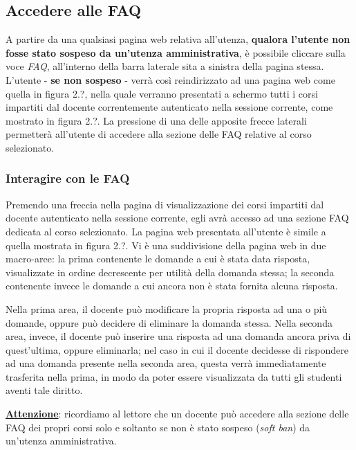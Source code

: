 \documentclass [a4paper,11pt]{book}
\begin{document}
\medskip

\subsection{Accedere alle FAQ}

A partire da una qualsiasi pagina web relativa all'utenza, \textbf{qualora l'utente non fosse stato sospeso da un'utenza amministrativa}, è possibile cliccare sulla voce \emph{FAQ}, all'interno della barra laterale sita a sinistra della pagina stessa. L'utente - \textbf{se non sospeso} - verrà così reindirizzato ad una pagina web come quella in figura 2.?, nella quale verranno presentati a schermo tutti i corsi impartiti dal docente correntemente autenticato nella sessione corrente, come mostrato in figura 2.?. La pressione di una delle apposite frecce laterali permetterà all'utente di accedere alla sezione delle FAQ relative al corso selezionato.

\medskip

\subsubsection{Interagire con le FAQ}

Premendo una freccia nella pagina di visualizzazione dei corsi impartiti dal docente autenticato nella sessione corrente, egli avrà accesso ad una sezione FAQ dedicata al corso selezionato. La pagina web presentata all'utente è simile a quella mostrata in figura 2.?. Vi è una suddivisione della pagina web in due macro-aree: la prima contenente le domande a cui è stata data risposta, visualizzate in ordine decrescente per utilità della domanda stessa; la seconda contenente invece le domande a cui ancora non è stata fornita alcuna risposta. 

Nella prima area, il docente può modificare la propria risposta ad una o più domande, oppure può decidere di eliminare la domanda stessa. Nella seconda area, invece, il docente può inserire una risposta ad una domanda ancora priva di quest'ultima, oppure eliminarla; nel caso in cui il docente decidesse di rispondere ad una domanda presente nella seconda area, questa verrà immediatamente trasferita nella prima, in modo da poter essere visualizzata da tutti gli studenti aventi tale diritto.

\textbf{\underline{Attenzione}}: ricordiamo al lettore che un docente può accedere alla sezione delle FAQ dei propri corsi solo e soltanto se non è stato sospeso (\emph{soft ban}) da un'utenza amministrativa.
\end{document}
